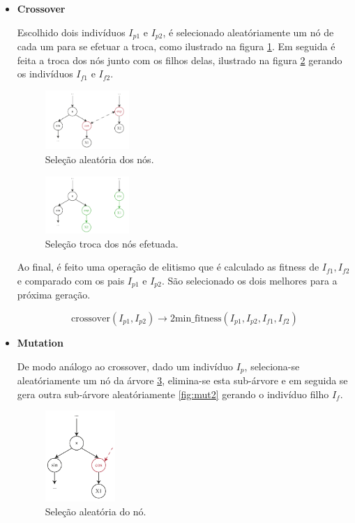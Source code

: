 \begin{itemize}
	\item \textbf{Crossover}

	Escolhido dois indivíduos $I_{p1}$ e $I_{p2}$, é selecionado aleatóriamente um nó de cada um para se efetuar a troca, como ilustrado na figura \ref{fig:cross1}. Em seguida é feita a troca dos nós junto com os filhos delas, ilustrado na figura \ref{fig:cross2} gerando os indivíduos $I_{f1}$ e $I_{f2}$.

	\begin{figure}[H]
	  \centering
	  \includegraphics[width=0.3\textwidth]{pdf/cross_ex_1.pdf}
	  \caption{Seleção aleatória dos nós.}
	  \label{fig:cross1}
	\end{figure}

	\begin{figure}[H]
	  \centering
	  \includegraphics[width=0.3\textwidth]{pdf/cross_ex_2.pdf}
	  \caption{Seleção troca dos nós efetuada.}
	  \label{fig:cross2}
	\end{figure}

	Ao final, é feito uma operação de elitismo que é calculado as fitness de $I_{f1}, I_{f2}$ e comparado com os pais $I_{p1}$ e $I_{p2}$. São selecionado os dois melhores para a próxima geração.

	\[\textrm{crossover}(I_{p1}, I_{p2}) \rightarrow \textrm{2min\_fitness}(I_{p1}, I_{p2}, I_{f1}, I_{f2})\]

	\item \textbf{Mutation}

	De modo análogo ao crossover, dado um indivíduo $I_p$, seleciona-se aleatóriamente um nó da árvore \ref{fig:mut1}, elimina-se esta sub-árvore e em seguida se gera outra sub-árvore aleatóriamente \ref{fig:mut2} gerando o indivíduo filho $I_f$.

	\begin{figure}[H]
	  \centering
	  \includegraphics[width=0.25\textwidth]{pdf/mut_ex_1.pdf}
	  \caption{Seleção aleatória do nó.}
	  \label{fig:mut1}
	\end{figure}


\end{itemize}
